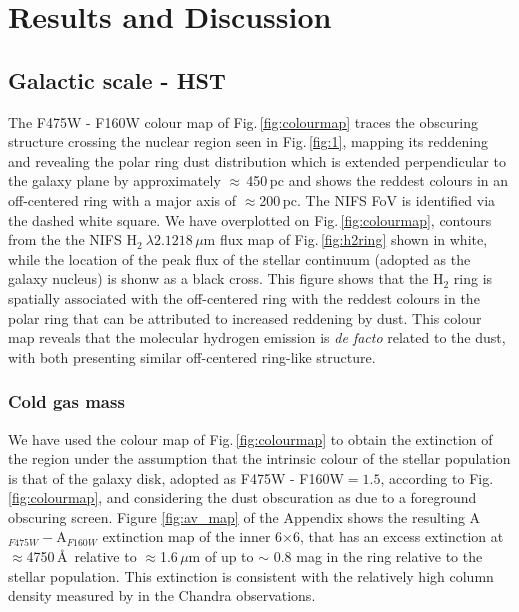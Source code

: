 \documentclass[fleqn,usenatbib]{mnras}
\begin{document}
\section{Results and Discussion}

\subsection{Galactic scale - HST}
\label{ss:hst_images}

The F475W - F160W colour map of Fig.\,\ref{fig:colourmap} traces the obscuring structure crossing the nuclear region seen in Fig.\,\ref{fig:1}, mapping its reddening and revealing the polar ring dust distribution which is extended perpendicular to the galaxy plane by approximately $\approx$\,450\,pc and shows the reddest colours in an off-centered ring with a major axis of $\approx$200\,pc. The NIFS FoV is identified via the dashed white square. We have overplotted on Fig.\,\ref{fig:colourmap}, contours from the the NIFS H$_2\ \lambda2.1218\,\mu$m flux map of Fig.\,\ref{fig:h2ring} shown in white,
while the location of the peak flux of the stellar continuum (adopted as the galaxy nucleus) is shonw as a black cross. This figure shows that the H$_2$ ring is spatially associated with the off-centered ring with the reddest colours in the polar ring that can be attributed to increased reddening by dust. This colour map reveals that the molecular hydrogen emission is \textit{de facto} related to the dust, with both presenting similar off-centered ring-like structure.

\subsubsection{Cold gas mass}

We have used the colour map of Fig.\,\ref{fig:colourmap} to obtain the extinction of the region under the assumption that the intrinsic colour of the stellar population is that of the galaxy disk, adopted as F475W - F160W$=1.5$, according to Fig.\,\ref{fig:colourmap}, and considering the dust obscuration as due to a foreground obscuring screen. Figure \ref{fig:av_map} of the Appendix shows the resulting A$_{F475W}-$A$_{F160W}$ extinction map of the inner 6$\times$6, that has an excess extinction at $\approx$4750\,\AA\ relative to $\approx$1.6$\,\mu$m of up to $\sim$ 0.8 mag in the ring relative to the stellar population. This extinction is consistent with the relatively high column density measured by \citet{gonzalez-martin_x-ray_2009} in the Chandra observations.
\end{document}
